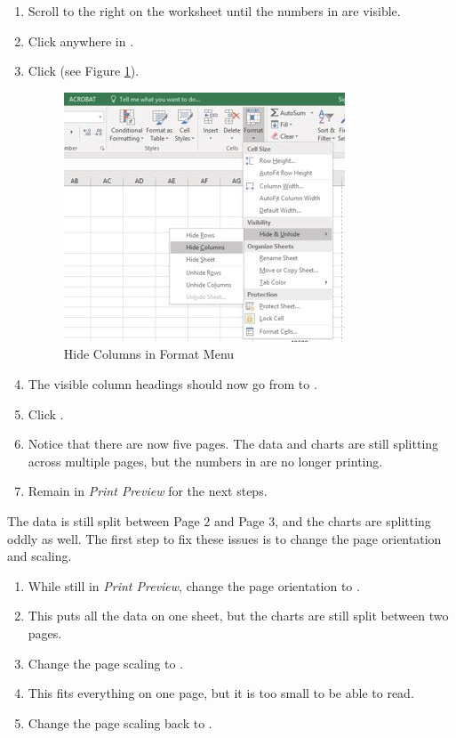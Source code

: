 \begin{enumerate}
	\item Scroll to the right on the worksheet until the numbers in  are visible.
	\item Click anywhere in .
	\item Click  (see Figure \ref{04:fig52}).
	
	\begin{figure}[H]
		\centering
		\includegraphics[width=\maxwidth{.95\linewidth}]{gfx/ch04_fig52}
		\caption{Hide Columns in Format Menu}
		\label{04:fig52}
	\end{figure}
		
	\item The visible column headings should now go from  to .
	\item Click .
	\item Notice that there are now five pages. The data and charts are still splitting across multiple pages, but the numbers in  are no longer printing.
	\item Remain in \textit{Print Preview} for the next steps.
\end{enumerate}

The data is still split between Page $ 2 $ and Page $ 3 $, and the charts are splitting oddly as well. The first step to fix these issues is to change the page orientation and scaling.

\begin{enumerate}
	\item While still in \textit{Print Preview}, change the page orientation to .
	\item This puts all the data on one sheet, but the charts are still split between two pages.
	\item Change the page scaling to .
	\item This fits everything on one page, but it is too small to be able to read.
	\item Change the page scaling back to .
\end{enumerate}

